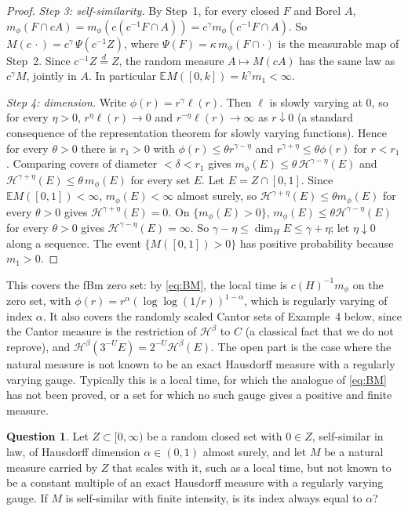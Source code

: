 \documentclass[11pt]{article}
\theoremstyle{remark}
\theoremstyle{definition}
\newtheorem{question}[theorem]{Question}
\newcommand{\E}{\mathbb{E}}
\begin{document}
\begin{proof}
\emph{Step 3: self-similarity.} By Step~1, for every closed $F$ and Borel $A$, $m_\phi(F\cap cA)=m_\phi(c(c^{-1}F\cap A))=c^\gamma m_\phi(c^{-1}F\cap A)$. So $M(c\,\cdot)=c^\gamma\,\Psi(c^{-1}Z)$, where $\Psi(F)=\kappa\,m_\phi(F\cap\cdot)$ is the measurable map of Step~2. Since $c^{-1}Z\overset{d}{=}Z$, the random measure $A\mapsto M(cA)$ has the same law as $c^\gamma M$, jointly in $A$. In particular $\E M([0,k])=k^\gamma m_1<\infty$.

\emph{Step 4: dimension.} Write $\phi(r)=r^\gamma\ell(r)$. Then $\ell$ is slowly varying at $0$, so for every $\eta>0$, $r^{\eta}\ell(r)\to0$ and $r^{-\eta}\ell(r)\to\infty$ as $r\downarrow0$ (a standard consequence of the representation theorem for slowly varying functions). Hence for every $\theta>0$ there is $r_1>0$ with $\phi(r)\le\theta r^{\gamma-\eta}$ and $r^{\gamma+\eta}\le\theta\phi(r)$ for $r<r_1$. Comparing covers of diameter $<\delta<r_1$ gives $m_\phi(E)\le\theta\,\mathcal H^{\gamma-\eta}(E)$ and $\mathcal H^{\gamma+\eta}(E)\le\theta\,m_\phi(E)$ for every set $E$. Let $E=Z\cap[0,1]$. Since $\E M([0,1])<\infty$, $m_\phi(E)<\infty$ almost surely, so $\mathcal H^{\gamma+\eta}(E)\le\theta m_\phi(E)$ for every $\theta>0$ gives $\mathcal H^{\gamma+\eta}(E)=0$. On $\{m_\phi(E)>0\}$, $m_\phi(E)\le\theta\mathcal H^{\gamma-\eta}(E)$ for every $\theta>0$ gives $\mathcal H^{\gamma-\eta}(E)=\infty$. So $\gamma-\eta\le\dim_HE\le\gamma+\eta$; let $\eta\downarrow0$ along a sequence. The event $\{M([0,1])>0\}$ has positive probability because $m_1>0$.
\end{proof}

This covers the fBm zero set: by \eqref{eq:BM}, the local time is $c(H)^{-1}m_\phi$ on the zero set, with $\phi(r)=r^\alpha(\log\log(1/r))^{1-\alpha}$, which is regularly varying of index $\alpha$. It also covers the randomly scaled Cantor sets of Example~4 below, since the Cantor measure is the restriction of $\mathcal H^\beta$ to $C$ (a classical fact that we do not reprove), and $\mathcal H^\beta(3^{-U}E)=2^{-U}\mathcal H^\beta(E)$. The open part is the case where the natural measure is not known to be an exact Hausdorff measure with a regularly varying gauge. Typically this is a local time, for which the analogue of \eqref{eq:BM} has not been proved, or a set for which no such gauge gives a positive and finite measure.

\begin{question}\label{q:dim}
Let $Z\subset[0,\infty)$ be a random closed set with $0\in Z$, self-similar in law, of Hausdorff dimension $\alpha\in(0,1)$ almost surely, and let $M$ be a natural measure carried by $Z$ that scales with it, such as a local time, but not known to be a constant multiple of an exact Hausdorff measure with a regularly varying gauge. If $M$ is self-similar with finite intensity, is its index always equal to $\alpha$?
\end{question}
\end{document}
